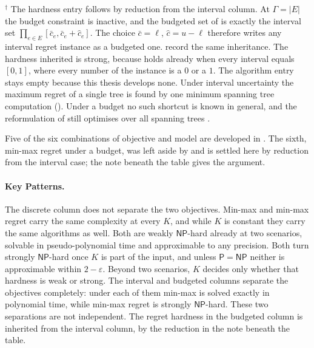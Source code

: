 \begin{table}[htbp]
{\vspace{0.9ex}
\begin{minipage}{\textwidth}
\footnotesize $^{\dagger}$ The hardness entry follows by reduction from the interval column. At $\Gamma = |E|$ the budget constraint is inactive, and the budgeted set of  is exactly the interval set $\prod_{e \in E} [\bar{c}_e, \bar{c}_e + \hat{c}_e]$. The choice $\bar{c} = \ell$, $\hat{c} = u - \ell$ therefore writes any interval regret instance as a budgeted one. \textcite[Section~8.5]{Goerigk2021RCO} record the same inheritance. The hardness inherited is strong, because  holds already when every interval equals $[0,1]$, where every number of the instance is a $0$ or a $1$. The algorithm entry stays empty because this thesis develops none. Under interval uncertainty the maximum regret of a single tree is found by one minimum spanning tree computation (). Under a budget no such shortcut is known in general, and the reformulation of \textcite{GoerigkHartisch2023} still optimises over all spanning trees \cite[Theorem~4.25]{Goerigk2021RCO}.
\end{minipage}}
\end{table}

Five of the six combinations of objective and model are developed in .
The sixth, min-max regret under a budget, was left aside by  and is settled here by reduction from the interval case; the note beneath the table gives the argument.

\paragraph{Key Patterns.}

The discrete column does not separate the two objectives.
Min-max and min-max regret carry the same complexity at every $K$, and while $K$ is constant they carry the same algorithms as well.
Both are weakly $\mathsf{NP}$-hard already at two scenarios, solvable in pseudo-polynomial time and approximable to any precision.
Both turn strongly $\mathsf{NP}$-hard once $K$ is part of the input, and unless $\mathsf{P} = \mathsf{NP}$ neither is approximable within $2 - \varepsilon$.
Beyond two scenarios, $K$ decides only whether that hardness is weak or strong.
The interval and budgeted columns separate the objectives completely: under each of them min-max is solved exactly in polynomial time, while min-max regret is strongly $\mathsf{NP}$-hard.
These two separations are not independent.
The regret hardness in the budgeted column is inherited from the interval column, by the reduction in the note beneath the table.

